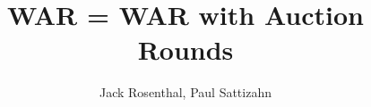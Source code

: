 \documentclass{beamer}
\title{WAR = WAR with Auction Rounds}
\author{Jack Rosenthal, Paul Sattizahn}
\institute{CSCI-410: Game Theory \& Networks}
\begin{document}
\begin{frame}
    \maketitle
\end{frame}
\end{document}
